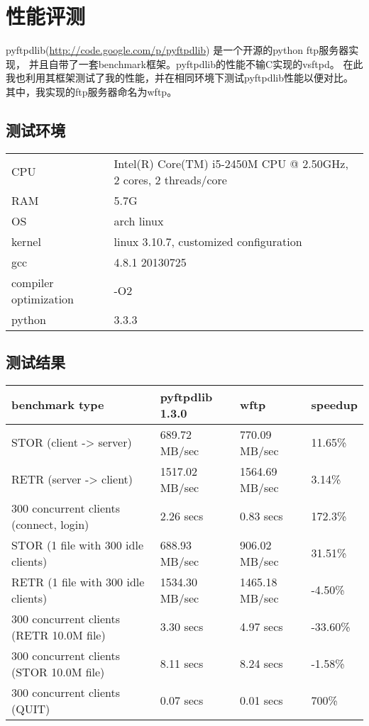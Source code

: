 \documentclass[a4paper]{article}
\begin{document}
\section{性能评测}
pyftpdlib(\url{http://code.google.com/p/pyftpdlib})
是一个开源的python ftp服务器实现，
并且自带了一套benchmark框架。pyftpdlib的性能不输C实现的vsftpd。
在此我也利用其框架测试了我的性能，并在相同环境下测试pyftpdlib性能以便对比。
其中，我实现的ftp服务器命名为wftp。

\subsection{测试环境}
\begin{center}\begin{tabular}{ll}
	CPU & Intel(R) Core(TM) i5-2450M CPU @ 2.50GHz, 2 cores, 2 threads/core \\
	RAM & 5.7G \\
	OS & arch linux \\
	kernel & linux 3.10.7, customized configuration \\
	gcc &   4.8.1 20130725 \\
	compiler optimization & -O2 \\
	python & 3.3.3 
\end{tabular}\end{center}

\subsection{测试结果}
\begin{center}\begin{tabular}{l|l|l|l}
	\hline
	benchmark type & pyftpdlib 1.3.0 & wftp & speedup \\ \hline
	STOR (client -> server) & 689.72 MB/sec & 770.09 MB/sec & 11.65\% \\
	RETR (server -> client) & 1517.02 MB/sec & 1564.69 MB/sec & 3.14\% \\
	300 concurrent clients (connect, login) & 2.26 secs & 0.83 secs & 172.3\% \\
	STOR (1 file with 300 idle clients) & 
		688.93 MB/sec & 906.02 MB/sec & 31.51\% \\
	RETR (1 file with 300 idle clients) &
		1534.30 MB/sec & 1465.18 MB/sec & -4.50\% \\
	300 concurrent clients (RETR 10.0M file) &
		3.30 secs & 4.97 secs & -33.60\% \\
	300 concurrent clients (STOR 10.0M file) &
		8.11 secs & 8.24 secs & -1.58\% \\
	300 concurrent clients (QUIT) &  0.07 secs & 0.01 secs & 700\% \\
	\hline
\end{tabular}\end{center}
\end{document}
